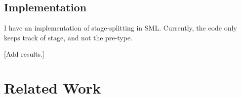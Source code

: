 \documentclass[11pt]{article}
\newcommand {\bbone} {\mathbbm 1}
\newcommand {\bbtwo} {\mathbbm 2}
\newcommand {\letin} [3] {{\tt let}~{#1} = {#2}~{\tt in}~{#3}}
\newcommand {\caseof} [3] {{\tt case}~{#1} ~{\tt of}~{#2}~{\tt |}~{#3}}
\newcommand {\tallcase} [3] {\begin{array}{l} {\tt case}~{#1} ~{\tt of}\\~~{#2}\\{\tt |}~{#3} \end{array}}
\newcommand {\splits} {\overset{\bbtwo}\rightsquigarrow}
\begin{document}

\subsection{Implementation}

I have an implementation of stage-splitting in SML.  Currently, the code only keeps track of stage, and not the pre-type.

[Add results.]

\section{Related Work}
\label{sec:lit}
\end{document}

